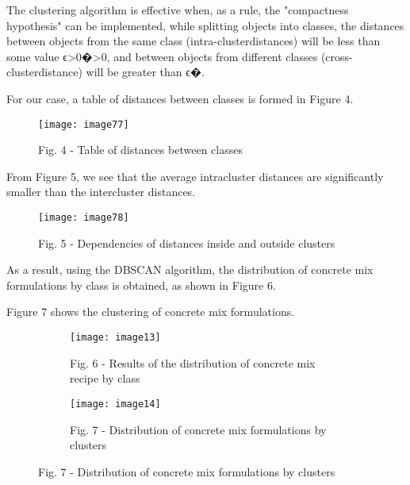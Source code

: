 The clustering algorithm is effective when, as a rule, the "compactness
hypothesis" can be implemented, while splitting objects into classes,
the distances between objects from the same class
(intra-clusterdistances) will be less than some value
ϵ\textgreater0�\textgreater0, and between objects from different classes
(cross-clusterdistance) will be greater than ϵ�.

For our case, a table of distances between classes is formed in Figure 4.

\begin{figure}
  \centering
  \texttt{[image: image77]}
  \caption*{Fig. 4 - Table of distances between classes}
\end{figure}

From Figure 5, we see that the average intracluster distances are
significantly smaller than the intercluster distances.

\begin{figure}
  \centering
  \texttt{[image: image78]}
  \caption*{Fig. 5 - Dependencies of distances inside and outside clusters}
\end{figure}

As a result, using the DBSCAN algorithm, the distribution of concrete
mix formulations by class is obtained, as shown in Figure 6.

Figure 7 shows the clustering of concrete mix formulations.

\begin{figure}[H]
\begin{subfigure}[b]{0.45\textwidth}
  \centering
  \texttt{[image: image13]}
  \caption*{Fig. 6 - Results of the distribution of concrete mix recipe by class}
\end{subfigure}
\hspace{0.05\textwidth}
\begin{subfigure}[b]{0.45\textwidth}
  \centering
  \texttt{[image: image14]}
  \caption*{Fig. 7 - Distribution of concrete mix formulations by clusters}
\end{subfigure}
\end{figure}

